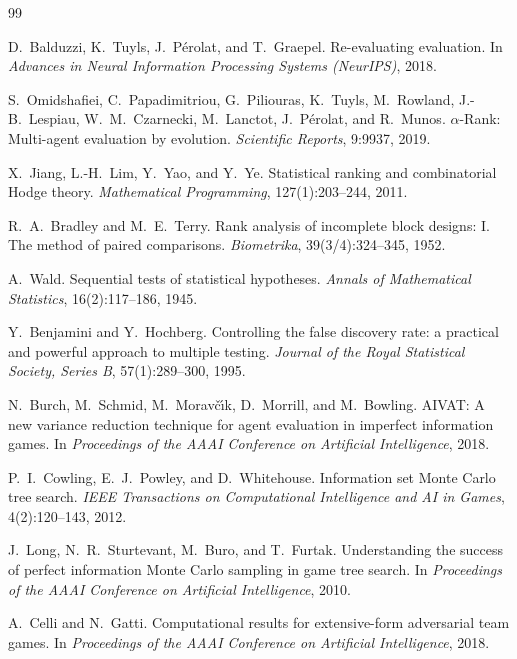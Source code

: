 \documentclass[11pt]{article}
\begin{document}
\begin{thebibliography}{99}
\small

D.~Balduzzi, K.~Tuyls, J.~P\'erolat, and T.~Graepel.
\newblock Re-evaluating evaluation.
\newblock In \emph{Advances in Neural Information Processing Systems (NeurIPS)}, 2018.

S.~Omidshafiei, C.~Papadimitriou, G.~Piliouras, K.~Tuyls, M.~Rowland, J.-B.~Lespiau,
W.~M.~Czarnecki, M.~Lanctot, J.~P\'erolat, and R.~Munos.
\newblock $\alpha$-Rank: Multi-agent evaluation by evolution.
\newblock \emph{Scientific Reports}, 9:9937, 2019.

X.~Jiang, L.-H.~Lim, Y.~Yao, and Y.~Ye.
\newblock Statistical ranking and combinatorial Hodge theory.
\newblock \emph{Mathematical Programming}, 127(1):203--244, 2011.

R.~A.~Bradley and M.~E.~Terry.
\newblock Rank analysis of incomplete block designs: I. The method of paired comparisons.
\newblock \emph{Biometrika}, 39(3/4):324--345, 1952.

A.~Wald.
\newblock Sequential tests of statistical hypotheses.
\newblock \emph{Annals of Mathematical Statistics}, 16(2):117--186, 1945.

Y.~Benjamini and Y.~Hochberg.
\newblock Controlling the false discovery rate: a practical and powerful approach to
multiple testing.
\newblock \emph{Journal of the Royal Statistical Society, Series B}, 57(1):289--300, 1995.

N.~Burch, M.~Schmid, M.~Morav\v{c}\'{\i}k, D.~Morrill, and M.~Bowling.
\newblock AIVAT: A new variance reduction technique for agent evaluation in imperfect
information games.
\newblock In \emph{Proceedings of the AAAI Conference on Artificial Intelligence}, 2018.

P.~I.~Cowling, E.~J.~Powley, and D.~Whitehouse.
\newblock Information set Monte Carlo tree search.
\newblock \emph{IEEE Transactions on Computational Intelligence and AI in Games},
4(2):120--143, 2012.

J.~Long, N.~R.~Sturtevant, M.~Buro, and T.~Furtak.
\newblock Understanding the success of perfect information Monte Carlo sampling in game
tree search.
\newblock In \emph{Proceedings of the AAAI Conference on Artificial Intelligence}, 2010.

A.~Celli and N.~Gatti.
\newblock Computational results for extensive-form adversarial team games.
\newblock In \emph{Proceedings of the AAAI Conference on Artificial Intelligence}, 2018.


\end{thebibliography}
\end{document}
